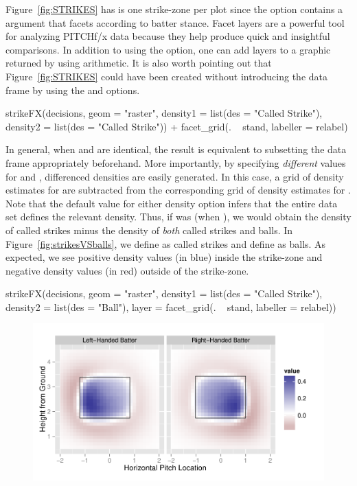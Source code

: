 \begin{article}
Figure~\ref{fig:STRIKES} has is one strike-zone per plot since the
 option contains a  argument that facets
according to batter stance. Facet layers are a powerful tool for analyzing
PITCHf/x data because they help produce quick and insightful comparisons.
In addition to using the  option, one can add layers
to a graphic returned by  using  arithmetic.
It is also worth pointing out that Figure~\ref{fig:STRIKES} could
have been created without introducing the  data frame
by using the  and  options. 
%
\begin{Schunk}
\begin{Sinput}
strikeFX(decisions, geom = "raster", density1 = list(des = "Called Strike"),          
  density2 = list(des = "Called Strike")) + facet_grid(. ~ stand, labeller = relabel)
\end{Sinput}
\end{Schunk}
%
In general, when  and  are identical,
the result is equivalent to subsetting the data frame appropriately
beforehand. More importantly, by specifying \emph{different} values
for  and , differenced densities are
easily generated. In this case, a grid of density estimates for 
are subtracted from the corresponding grid of density estimates for
. Note that the default  value for either
density option infers that the entire data set defines the relevant
density. Thus, if  was  (when ),
we would obtain the density of called strikes minus the density of
\emph{both} called strikes and balls. In Figure~\ref{fig:strikesVSballs},
we define  as called strikes and define 
as balls. As expected, we see positive density values (in blue) inside
the strike-zone and negative density values (in red) outside of the
strike-zone. 
%
\begin{Schunk}
\begin{Sinput}
strikeFX(decisions, geom = "raster", density1 = list(des = "Called Strike"), 
  density2 = list(des = "Ball"), layer = facet_grid(. ~ stand, labeller = relabel)) 
\end{Sinput}
\end{Schunk}
%
\begin{figure}[h]
\centerline{\includegraphics[scale = 1]{strikesVSballs.pdf}}


\end{figure}
\end{article}
